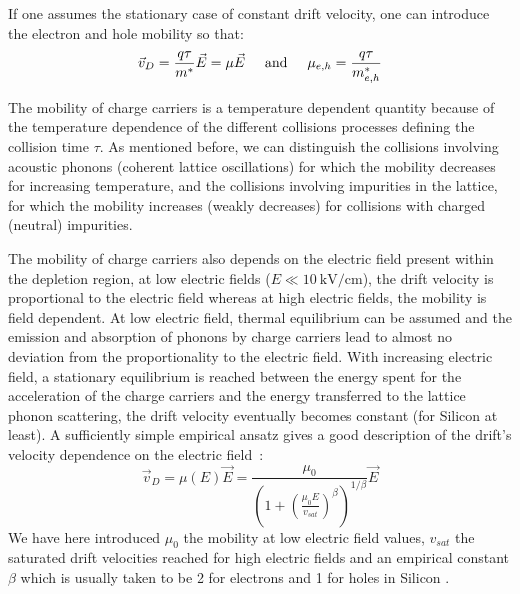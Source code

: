 		If one assumes the stationary case of constant drift velocity, one can introduce the electron and hole mobility so that: 
		\begin{equation}
			\vec{v}_D = \frac{q \tau}{m^*} \vec{E} = \mu \vec{E} \hspace{5mm} \text{and} \hspace{5mm} \mu_{e,h} = \frac{q\tau}{m^*_{e,h}}
		\end{equation}
		
	
	

		The mobility of charge carriers is a temperature dependent quantity because of the temperature dependence of the different collisions processes defining the collision time $\tau$. As mentioned before, we can distinguish the collisions involving acoustic phonons (coherent lattice oscillations) for which the mobility decreases for increasing temperature, and the collisions involving impurities in the lattice, for which the mobility increases (weakly decreases) for collisions with charged (neutral) impurities.  

		The mobility of charge carriers also depends on the electric field present within the depletion region, at low electric fields ($E \ll \SI{10}{\kilo \volt \per \centi\meter}$), the drift velocity is proportional to the electric field whereas at high electric fields, the mobility is field dependent. At low electric field, thermal equilibrium can be assumed and the emission and absorption of phonons by charge carriers lead to almost no deviation from the proportionality to the electric field. With increasing electric field, a stationary equilibrium is reached between the energy spent for the acceleration of the charge carriers and the energy transferred to the lattice phonon scattering, the drift velocity eventually becomes constant (for Silicon at least). A sufficiently simple empirical ansatz gives a good description of the drift's velocity dependence on the electric field\ \cite{drift_velocity_vs_E}: 
		\begin{equation}
			\vec{v}_D = \mu(E) \vec{E} = \frac{\mu_0}{{\left(1 + {\left( \frac{\mu_0 E}{v_{sat}} \right)^\beta}\right)^{1/\beta}}} \vec{E}
			\label{eq:drift_velocity}
		\end{equation}
		We have here introduced $\mu_0$ the mobility at low electric field values, $v_{sat}$ the saturated drift velocities reached for high electric fields and an empirical constant $\beta$ which is usually taken to be 2 for electrons and 1 for holes in Silicon \cite{beta_drift_velocity}.  
		
